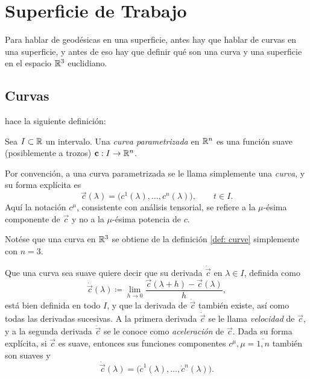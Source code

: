 \section{Superficie de Trabajo}
Para hablar de geodésicas en una superficie, antes hay que hablar de curvas en una superficie, y antes de eso hay que definir qué son una curva y una superficie en el espacio $\mathbb R^3$ euclidiano.

\subsection{Curvas}

\parencite{tapp-2016} hace la siguiente definición:
\begin{definition}\label{def: curve}
	Sea $I \subset \mathbb R$ un intervalo. Una \emph{curva parametrizada} en $\mathbb R^n$ es una función suave (posiblemente a trozos) $\mathbf c : I \to \mathbb R^n$.
\end{definition}
Por convención, a una curva parametrizada se le llama simplemente una \emph{curva}, y su forma explícita es
\begin{equation}
	\vec c(\lambda) = \bigl(c^1(\lambda), \dotsc , c^n(\lambda) \bigr), \qquad t \in I.
\end{equation}
Aquí la notación $c^\mu$, consistente con análisis tensorial, se refiere a la $\mu$-ésima componente de $\vec c$ y no a la $\mu$-ésima potencia de $c$.

Notése que una curva en $\mathbb R^3$ se obtiene de la definición \ref{def: curve} simplemente con $n = 3$.

Que una curva sea suave quiere decir que su derivada $\dot{ \vec c}$ en $\lambda \in I$, definida como
\begin{equation}
	\dot{\vec c}(\lambda) \coloneqq  \lim_{h \to 0} \frac{\vec c(\lambda + h) - \vec c(\lambda)}{h},
\end{equation}
está bien definida en todo $I$, y que la derivada de $\dot{\vec c}$ también existe, así como todas las derivadas sucesivas. A la primera derivada $\dot{\vec c}$ se le llama \emph{velocidad} de $\vec c$, y a la segunda derivada $\ddot{\vec c}$ se le conoce como \emph{aceleración} de $\vec c$. Dada su forma explícita, si $\vec c$ es suave, entonces sus funciones componentes $c^\mu, \mu = \overline{1, n}$ también son suaves y
\begin{equation}
	\dot{\vec c}(\lambda) = \bigl(\dot c^1(\lambda), \dotsc , \dot c^n(\lambda) \bigr).
\end{equation}


